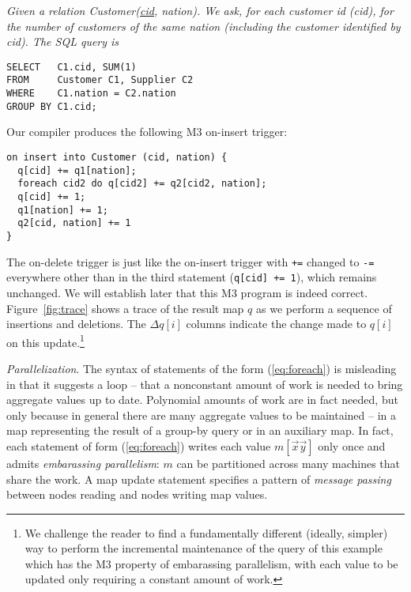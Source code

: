 \begin{example}\em
\label{ex:self-join}
Given a relation Customer(\underline{cid}, nation).
We ask, for each customer id (cid),
for the number of customers of the same nation (including the customer
identified by cid).
The SQL query is
\begin{verbatim}
SELECT   C1.cid, SUM(1)
FROM     Customer C1, Supplier C2
WHERE    C1.nation = C2.nation
GROUP BY C1.cid;
\end{verbatim}
Our compiler produces the following M3 on-insert trigger:
\begin{verbatim}
on insert into Customer (cid, nation) {
  q[cid] += q1[nation];
  foreach cid2 do q[cid2] += q2[cid2, nation];
  q[cid] += 1;
  q1[nation] += 1;
  q2[cid, nation] += 1
}
\end{verbatim}
The on-delete trigger is just like the on-insert trigger with {\tt +=}
changed to {\tt -=} everywhere other than in the third statement
({\tt q[cid] += 1}), which remains unchanged.
We will establish later that this M3 program is indeed correct.
Figure~\ref{fig:trace} shows a trace of the result map $q$ as we perform
a sequence of insertions and deletions. The $\Delta q[i]$ columns
indicate the change made to $q[i]$ on this update.\footnote{We
challenge the reader to find a 
fundamentally different (ideally, simpler) way to
perform the incremental maintenance of the query of this example
which has the M3 property of embarassing parallelism, with each value
to be updated only requiring a constant amount of work.}
\punto
\end{example}


{\em Parallelization}.
The syntax of statements of the form (\ref{eq:foreach})
is misleading in that it suggests a loop --
that a nonconstant amount of work is needed to bring aggregate
values up to date. Polynomial amounts of work are in fact needed,
but only because in general there are many aggregate values
to be maintained -- in a
map representing the result of a group-by query or in an auxiliary map.
In fact, each statement of form (\ref{eq:foreach})
writes each value $m[\vec{x}\vec{y}]$ only once and admits
{\em embarassing parallelism}: $m$ can be partitioned across many machines
that share the work. A map update statement specifies a
pattern of {\em message passing} between nodes reading and nodes writing
map values.



